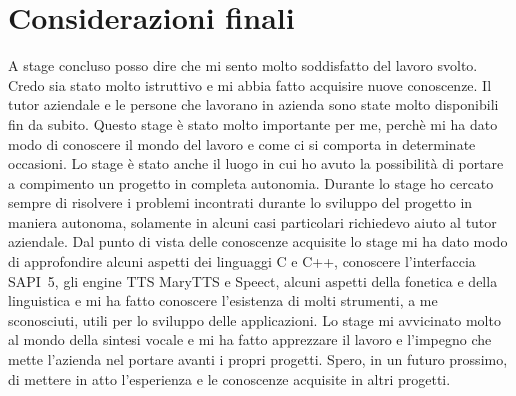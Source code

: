 \section{Considerazioni finali}
A stage concluso posso dire che mi sento molto soddisfatto del lavoro svolto. Credo sia stato molto istruttivo e mi abbia fatto acquisire nuove conoscenze.
Il tutor aziendale e le persone che lavorano in azienda sono state molto disponibili fin da subito.
Questo stage è stato molto importante per me, perchè mi ha dato modo di conoscere il mondo del lavoro e come ci si comporta in determinate occasioni.
Lo stage è stato anche il luogo in cui ho avuto la possibilità di portare a compimento un progetto in completa autonomia.
Durante lo stage ho cercato sempre di risolvere i problemi incontrati durante lo sviluppo del progetto in maniera autonoma, solamente in alcuni casi particolari richiedevo aiuto al tutor aziendale.
Dal punto di vista delle conoscenze acquisite lo stage mi ha dato modo di approfondire alcuni aspetti dei linguaggi C e C++, conoscere l'interfaccia SAPI~5, gli engine TTS MaryTTS e Speect, alcuni aspetti della fonetica e della linguistica e mi ha fatto conoscere l'esistenza di molti strumenti, a me sconosciuti, utili per lo sviluppo delle applicazioni.
Lo stage mi avvicinato molto al mondo della sintesi vocale e mi ha fatto apprezzare il lavoro e l'impegno che mette l'azienda nel portare avanti i propri progetti.
Spero, in un futuro prossimo, di mettere in atto l'esperienza e le conoscenze acquisite in altri progetti. 
 